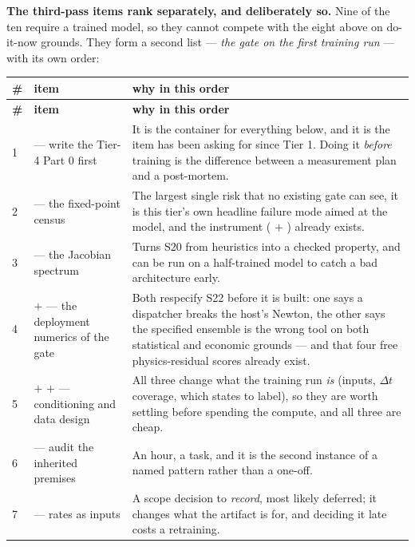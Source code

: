 \textbf{The third-pass items rank separately, and deliberately so.} Nine of
the ten require a trained model, so they cannot compete with the eight above
on do-it-now grounds. They form a second list --- \emph{the gate on the first
training run} --- with its own order:

\begingroup
\small
\begin{longtable}{@{}L{0.5cm} L{4.4cm} L{9.9cm}@{}}
\toprule
\textbf{\#} & \textbf{item} & \textbf{why in this order} \\
\midrule
\endfirsthead
\toprule
\textbf{\#} & \textbf{item} & \textbf{why in this order} \\
\midrule
\endhead
\bottomrule
\endfoot

1 &  --- write the Tier-4 Part 0 first &
It is the container for everything below, and it is the item
 has been asking for since Tier 1. Doing it \emph{before}
training is the difference between a measurement plan and a post-mortem. \\

2 &  --- the fixed-point census &
The largest single risk that no existing gate can see, it is this tier's own
headline failure mode aimed at the model, and the instrument
( $+$ ) already exists. \\

3 &  --- the Jacobian spectrum &
Turns S20 from heuristics into a checked property, and can be run on a
half-trained model to catch a bad architecture early. \\

4 &  $+$  --- the deployment numerics of the gate &
Both respecify S22 before it is built: one says a dispatcher breaks the
host's Newton, the other says the specified ensemble is the wrong tool on
both statistical and economic grounds --- and that four free physics-residual
scores already exist. \\

5 &  $+$  $+$  --- conditioning and data
design &
All three change what the training run \emph{is} (inputs, $\Delta t$
coverage, which states to label), so they are worth settling before spending
the compute, and all three are cheap. \\

6 &  --- audit the inherited premises &
An hour, a  task, and it is the second instance of a named
pattern rather than a one-off. \\

7 &  --- rates as inputs &
A scope decision to \emph{record}, most likely deferred; it changes what the
artifact is for, and deciding it late costs a retraining. \\
\end{longtable}
\endgroup


